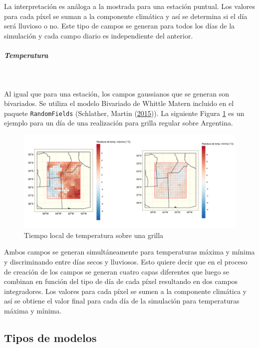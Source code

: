 \documentclass[
  12pt]{article}
\begin{document}
La interpretación es análoga a la mostrada para una estación puntual. Los valores para cada píxel se suman a la componente climática y así se determina si el día será lluvioso o no. Este tipo de campos se generan para todos los días de la simulación y cada campo diario es independiente del anterior.

\hypertarget{temperatura-2}{%
\subparagraph{Temperatura}\label{temperatura-2}}

~

Al igual que para una estación, los campos gaussianos que se generan son bivariados. Se utiliza el modelo Bivariado de Whittle Matern incluido en el paquete \texttt{RandomFields} (Schlather, Martin (\protect\hyperlink{ref-RN4406}{2015})). La siguiente Figura \ref{fig:random-field-temperature} es un ejemplo para un día de una realización para grilla regular sobre Argentina.

\begin{figure}[H]

{\centering \includegraphics[width=0.95\linewidth]{./docs/figures/random_field_temperature} 

}

\caption{Tiempo local de temperatura sobre una grilla}\label{fig:random-field-temperature}
\end{figure}

Ambos campos se generan simultáneamente para temperaturas máxima y mínima y discriminando entre días secos y lluviosos. Esto quiere decir que en el proceso de creación de los campos se generan cuatro capas diferentes que luego se combinan en función del tipo de día de cada píxel resultando en dos campos integradores.
Los valores para cada píxel se sumen a la componente climática y así se obtiene el valor final para cada día de la simulación para temperaturas máxima y mínima.

\hypertarget{tipos-de-modelos}{%
\subsection{Tipos de modelos}\label{tipos-de-modelos}}
\end{document}
